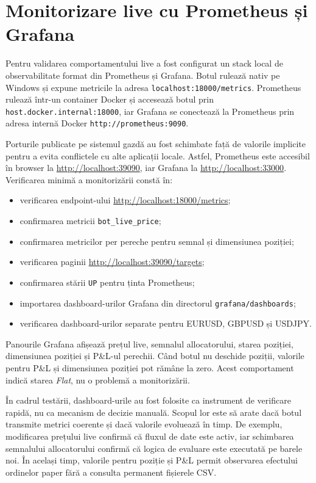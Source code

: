\section{Monitorizare live cu Prometheus și Grafana}
\label{cap:cap4:monitorizare_live}

Pentru validarea comportamentului live a fost configurat un stack local de observabilitate format din Prometheus și Grafana. Botul rulează nativ pe Windows și expune metricile la adresa \texttt{localhost:18000/metrics}. Prometheus rulează într-un container Docker și accesează botul prin \texttt{host.docker.internal:18000}, iar Grafana se conectează la Prometheus prin adresa internă Docker \texttt{http://prometheus:9090}.

Porturile publicate pe sistemul gazdă au fost schimbate față de valorile implicite pentru a evita conflictele cu alte aplicații locale. Astfel, Prometheus este accesibil în browser la \url{http://localhost:39090}, iar Grafana la \url{http://localhost:33000}. Verificarea minimă a monitorizării constă în:
\begin{itemize}
    \setlength{\itemsep}{0pt}
    \setlength{\parsep}{0pt}
    \setlength{\topsep}{3pt}
    \item verificarea endpoint-ului \url{http://localhost:18000/metrics};
    \item confirmarea metricii \texttt{bot\_live\_price};
    \item confirmarea metricilor per pereche pentru semnal și dimensiunea poziției;
    \item verificarea paginii \url{http://localhost:39090/targets};
    \item confirmarea stării \texttt{UP} pentru ținta Prometheus;
    \item importarea dashboard-urilor Grafana din directorul \texttt{grafana/dashboards};
    \item verificarea dashboard-urilor separate pentru EURUSD, GBPUSD și USDJPY.
\end{itemize}

Panourile Grafana afișează prețul live, semnalul allocatorului, starea poziției, dimensiunea poziției și P\&L-ul perechii. Când botul nu deschide poziții, valorile pentru P\&L și dimensiunea poziției pot rămâne la zero. Acest comportament indică starea \textit{Flat}, nu o problemă a monitorizării.

În cadrul testării, dashboard-urile au fost folosite ca instrument de verificare rapidă, nu ca mecanism de decizie manuală. Scopul lor este să arate dacă botul transmite metrici coerente și dacă valorile evoluează în timp. De exemplu, modificarea prețului live confirmă că fluxul de date este activ, iar schimbarea semnalului allocatorului confirmă că logica de evaluare este executată pe barele noi. În același timp, valorile pentru poziție și P\&L permit observarea efectului ordinelor paper fără a consulta permanent fișierele CSV.

